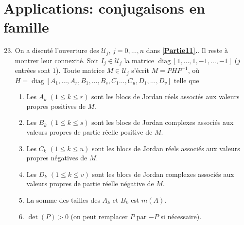 \documentclass[french, 12pt]{article}
\theoremstyle{definition}
\newcommand{\Ucal}{\mathcal{U}}
\newcommand{\diag}{\operatorname{diag}}
\begin{document}
\section*{Applications: conjugaisons en famille}
    \begin{enumerate}
        \setcounter{enumi}{22}
        \item \label{Partie23} On a discut\'e l'ouverture des $\Ucal_j$, $j = 0,\ldots,n$ dans {\bf \ref{Partie11}.}. Il reste \`a montrer leur connexit\'e. Soit $I_j \in \Ucal_j$ la matrice $\diag[1,\ldots,1,-1,\ldots,-1]$ ($j$ entr\'ees sont $1$). Toute matrice $ M \in \Ucal_j$ s'\'ecrit $M = PHP^{-1}$, o\`u $H = \diag[A_1,\ldots,A_r,B_1,\ldots,B_s,C_1\ldots,C_u,D_1,\ldots,D_v]$ telle que
        \begin{enumerate}
            \item Les $A_k$ $(1 \le k \le r)$ sont les blocs de Jordan r\'eels associ\'es aux valeurs propres positives de $M$.
            
            \item Les $B_k$ $(1 \le k \le s)$ sont les blocs de Jordan complexes associ\'es aux valeurs propres de partie r\'eelle positive de $M$.
            
            \item Les $C_k$ $(1 \le k \le u)$ sont les blocs de Jordan r\'eels associ\'es aux valeurs propres n\'egatives de $M$.
            
            \item Les $D_k$ $(1 \le k \le v)$ sont les blocs de Jordan complexes associ\'es aux valeurs propres de partie r\'eelle n\'egative de $M$.
            
            \item La somme des tailles des $A_k$ et $B_k$ est $m(A)$.
            
            \item $\det(P) > 0$ (on peut remplacer $P$ par $-P$ si n\'ecessaire).
        \end{enumerate}
        

\end{enumerate}
\end{document}
